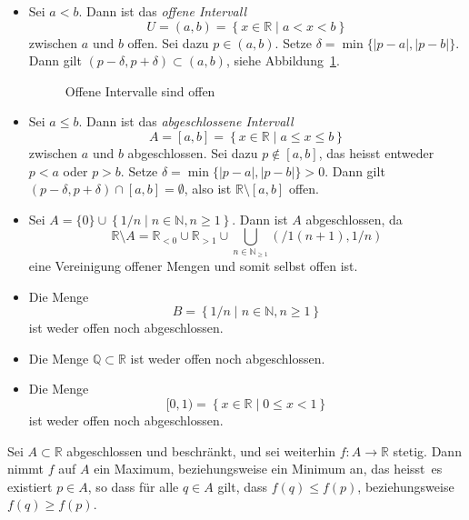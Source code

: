 \documentclass[../main.tex]{subfiles}
\begin{document}
\begin{examples}
  \leavevmode
  \begin{itemize}
    \item Sei
      $a < b$. Dann ist
      das \emph{offene Intervall}
      \[
        U = (a, b) = \left\{x \in \mathbb{R} \mid a < x < b\right\}
      \]
      zwischen $a$ und $b$ offen. Sei dazu $p \in (a, b)$. Setze
      $\delta = \min \{|p - a|, |p - b|\}$.
      Dann gilt
      $(p - \delta, p + \delta) \subset (a, b)$,
      siehe Abbildung~\ref{fig:offen}.
      \begin{figure}[htb]
        \centering
        
        \caption{Offene Intervalle
        sind offen}%
        \label{fig:offen}
      \end{figure}
      
    \item Sei $a \leq b$. Dann ist das \emph{abgeschlossene Intervall}
      \[
        A = [a, b] = \left\{x \in \mathbb{R} \mid a \leq x \leq b\right\}
      \]
      zwischen $a$ und $b$ abgeschlossen.
      Sei dazu $p \notin [a,b]$, das heisst entweder
      $p < a$ oder $p > b$.
      Setze $\delta = \min \{|p- a|, |p-b|\} > 0$.
      Dann gilt
      $(p - \delta, p + \delta) \cap [a, b] = \emptyset$,
      also ist $\mathbb{R} \setminus [a, b]$ offen.
    \item Sei $A = \{0\} \cup \left\{1/n \mid n \in 
      \mathbb{N}, n \geq 1\right\}$.
      Dann ist $A$ abgeschlossen, da
      \[
        \mathbb{R} \setminus A = \mathbb{R}_{<0} \cup
        \mathbb{R}_{>1} \cup \bigcup_{n \in \mathbb{N}_{\geq 1}}
        \left(/1(n+1), 1/n\right)
      \]
      eine Vereinigung offener Mengen und somit selbst offen ist.
    \item Die Menge
      \[
        B = \left\{1/n \mid n \in \mathbb{N}, n \geq 1\right\}
      \]
      ist weder offen noch abgeschlossen.
    \item Die Menge $\mathbb{Q} \subset \mathbb{R}$ 
      ist weder offen noch abgeschlossen.
    \item Die Menge
      \[
        [0, 1) = \left\{x \in \mathbb{R} \mid 0 \leq%
        x < 1\right\}
      \]
      ist weder offen noch abgeschlossen.
  \end{itemize}
\end{examples}

\begin{theorem}\label{thm:extreme}
  Sei $A \subset \mathbb{R}$ abgeschlossen
  und beschränkt,
  und sei weiterhin $f \colon A \to \mathbb{R}$
  stetig. Dann nimmt $f$ auf $A$ ein
  Maximum, beziehungsweise ein Minimum an,
  das heisst~es existiert $p \in A$,
  so dass für alle $q \in A$ gilt,
  dass $f(q) \leq f(p)$, beziehungsweise $f(q) \geq f(p)$.
\end{theorem}
\end{document}
